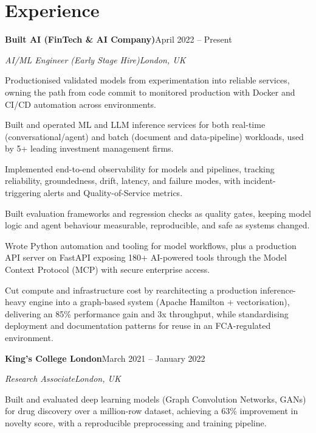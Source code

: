 \documentclass[10pt,a4paper]{article}
\newcommand{\entry}[4]{%
  {\color{company}\bfseries #1}\hfill {\color{muted}#2}\par
  \vspace{1pt}
  {\itshape #3}\hfill {\color{muted}\itshape #4}\par
  \vspace{3pt}%
}
\begin{document}
\section{Experience}
\entry{Built AI (FinTech \& AI Company)}{April 2022 -- Present}{AI/ML Engineer (Early Stage Hire)}{London, UK}
\begin{tight}
  \item Productionised validated models from experimentation into reliable services, owning the path from code commit to monitored production with Docker and CI/CD automation across environments.
  \item Built and operated ML and LLM inference services for both real-time (conversational/agent) and batch (document and data-pipeline) workloads, used by 5+ leading investment management firms.
  \item Implemented end-to-end observability for models and pipelines, tracking reliability, groundedness, drift, latency, and failure modes, with incident-triggering alerts and Quality-of-Service metrics.
  \item Built evaluation frameworks and regression checks as quality gates, keeping model logic and agent behaviour measurable, reproducible, and safe as systems changed.
  \item Wrote Python automation and tooling for model workflows, plus a production API server on FastAPI exposing 180+ AI-powered tools through the Model Context Protocol (MCP) with secure enterprise access.
  \item Cut compute and infrastructure cost by rearchitecting a production inference-heavy engine into a graph-based system (Apache Hamilton + vectorisation), delivering an 85\% performance gain and 3x throughput, while standardising deployment and documentation patterns for reuse in an FCA-regulated environment.
\end{tight}

\entry{King's College London}{March 2021 -- January 2022}{Research Associate}{London, UK}
\begin{tight}
  \item Built and evaluated deep learning models (Graph Convolution Networks, GANs) for drug discovery over a million-row dataset, achieving a 63\% improvement in novelty score, with a reproducible preprocessing and training pipeline.
\end{tight}

\end{document}
